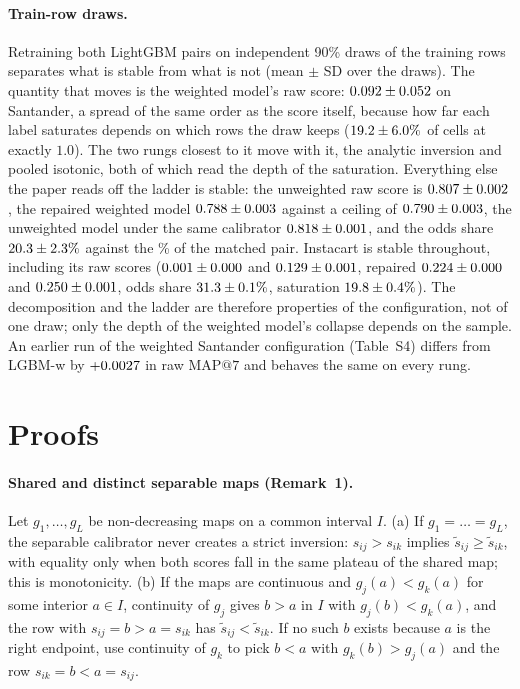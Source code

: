 \documentclass[sigconf,nonacm]{acmart}
\makeatletter
\newcommand{\Sm}{\textsf{LGBM-w}\xspace}
\newcommand{\mapseven}{\mathrm{MAP}@7\xspace}
\makeatother
\begin{document}
\paragraph{Train-row draws.} Retraining both LightGBM pairs on \nseedN{} independent 90\% draws of the training rows separates what is stable from what is not (mean $\pm$ SD over the draws). The quantity that moves is the weighted model's raw score: $0.092 \pm 0.052$ on Santander, a spread of the same order as the score itself, because how far each label saturates depends on which rows the draw keeps ($19.2 \pm 6.0\%$ of cells at exactly $1.0$). The two rungs closest to it move with it, the analytic inversion and pooled isotonic, both of which read the depth of the saturation. Everything else the paper reads off the ladder is stable: the unweighted raw score is $0.807 \pm 0.002$, the repaired weighted model $0.788 \pm 0.003$ against a ceiling of $0.790 \pm 0.003$, the unweighted model under the same calibrator $0.818 \pm 0.001$, and the odds share $20.3 \pm 2.3\%$ against the \noddsShare\% of the matched pair. Instacart is stable throughout, including its raw scores ($0.001 \pm 0.000$ and $0.129 \pm 0.001$, repaired $0.224 \pm 0.000$ and $0.250 \pm 0.001$, odds share $31.3 \pm 0.1\%$, saturation $19.8 \pm 0.4\%$). The decomposition and the ladder are therefore properties of the configuration, not of one draw; only the depth of the weighted model's collapse depends on the sample. An earlier run of the weighted Santander configuration (Table~S4) differs from \Sm by $+0.0027$ in raw $\mapseven$ and behaves the same on every rung.


\section{Proofs}
\label{app:proofs}
\paragraph{Shared and distinct separable maps (Remark~1).} Let $g_1,\dots,g_L$ be non-decreasing maps on a common interval $I$. (a) If $g_1=\dots=g_L$, the separable calibrator never creates a strict inversion: $s_{ij}>s_{ik}$ implies $\tilde s_{ij}\ge\tilde s_{ik}$, with equality only when both scores fall in the same plateau of the shared map; this is monotonicity. (b) If the maps are continuous and $g_j(a)<g_k(a)$ for some interior $a\in I$, continuity of $g_j$ gives $b>a$ in $I$ with $g_j(b)<g_k(a)$, and the row with $s_{ij}=b>a=s_{ik}$ has $\tilde s_{ij}<\tilde s_{ik}$. If no such $b$ exists because $a$ is the right endpoint, use continuity of $g_k$ to pick $b<a$ with $g_k(b)>g_j(a)$ and the row $s_{ik}=b<a=s_{ij}$.
\end{document}
